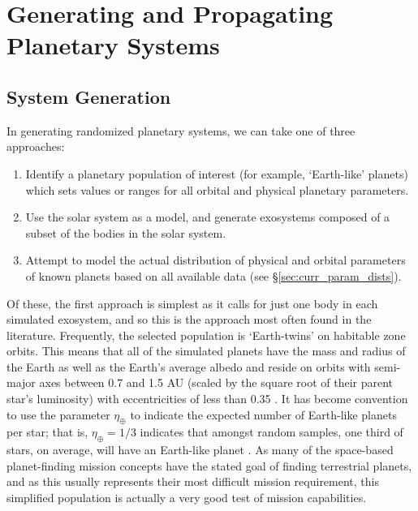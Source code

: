 \section{Generating and Propagating Planetary Systems}
\subsection{System Generation}\label{sec:gen_plan_sys}
In generating randomized planetary systems, we can take one of three approaches: 
\begin{enumerate}
\item Identify a planetary population of interest (for example, `Earth-like' planets) which sets values or ranges for all orbital and physical planetary parameters.  
\item Use the solar system as a model, and generate exosystems composed of a subset of the bodies in the solar system.
\item Attempt to model the actual distribution of physical and orbital parameters of known planets based on all available data (see \S\ref{sec:curr_param_dists}).
\end{enumerate}
Of these, the first approach is simplest as it calls for just one body in each simulated exosystem, and so this is the approach most often found in the literature.  Frequently, the selected population is `Earth-twins' on habitable zone orbits.  This means that all of the simulated planets have the mass and radius of the Earth as well as the Earth's average albedo and reside on orbits with semi-major axes between 0.7 and 1.5 AU (scaled by the square root of their parent star's luminosity) with eccentricities of less than 0.35 \citep{kasting1993,brown2005}.  It has become convention to use the parameter $\eta_\oplus$ to indicate the expected number of Earth-like planets per star; that is, $\eta_\oplus = 1/3$ indicates that amongst random samples, one third of stars, on average, will have an Earth-like planet \citep{beckwith2008}. As many of the space-based planet-finding mission concepts have the stated goal of finding terrestrial planets, and as this usually represents their most difficult mission requirement, this simplified population is actually a very good test of mission capabilities.

